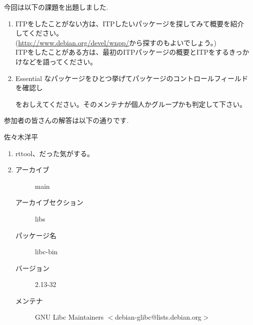 \documentclass[mingoth,a4paper]{jsarticle}
\begin{document}

今回は以下の課題を出題しました.
\begin{screen}
  \begin{enumerate}
  \item ITPをしたことがない方は、ITPしたいパッケージを探してみて概要を紹介してください。\\
    (\url{http://www.debian.org/devel/wnpp/}から探すのもよいでしょう。)\\
     ITPをしたことがある方は、最初のITPパッケージの概要とITPをするきっかけなどを語ってください。

   \item Essential なパッケージをひとつ挙げてパッケージのコントロールフィールドを確認し
     をおしえてください。そのメンテナが個人かグループかも判定して下さい。
  \end{enumerate}
\end{screen}

参加者の皆さんの解答は以下の通りです.

\begin{prework}{ 佐々木洋平 }
  \begin{enumerate}
  \item rttool、だった気がする。
  \item 
    \begin{description}
    \item [アーカイブ] main
    \item [アーカイブセクション] libs
    \item [パッケージ名] libc-bin
    \item [バージョン] 2.13-32
    \item [メンテナ] GNU Libc Maintainers $<$debian-glibc@lists.debian.org$>$
    \end{description}
  \end{enumerate}
\end{prework}
\end{document}
